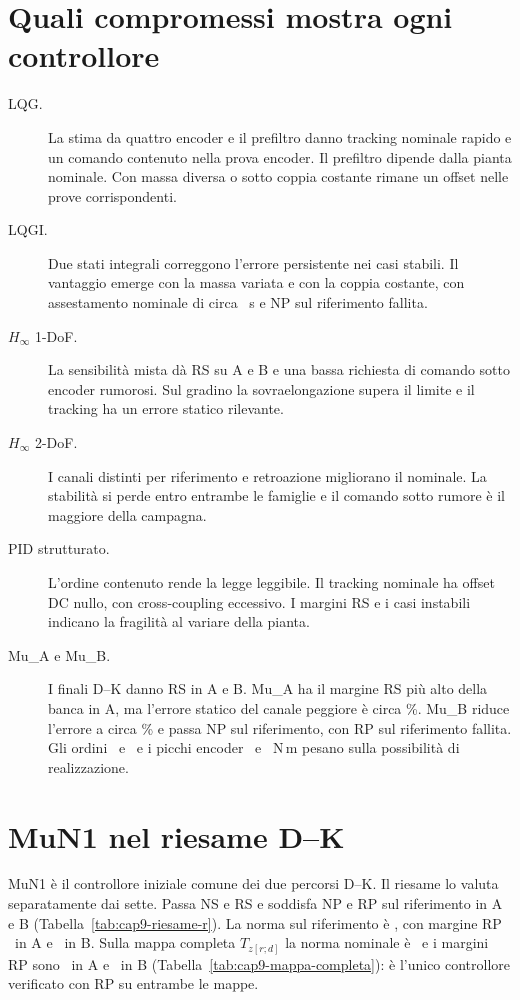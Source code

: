 \section{Quali compromessi mostra ogni controllore}
\begin{description}
\item[LQG.] La stima da quattro encoder e il prefiltro danno
tracking nominale rapido e un comando contenuto nella
prova encoder. Il prefiltro dipende dalla pianta nominale.
Con massa diversa o sotto coppia costante rimane un offset
nelle prove corrispondenti.
\item[LQGI.] Due stati integrali correggono l'errore persistente
nei casi stabili. Il vantaggio emerge con la massa variata
e con la coppia costante, con assestamento nominale di circa
\FinLQGITs\ s e NP sul riferimento fallita.
\item[$H_\infty$ 1-DoF.] La sensibilità mista dà RS su A e B
e una bassa richiesta di comando sotto encoder rumorosi.
Sul gradino la sovraelongazione supera il limite e il
tracking ha un errore statico rilevante.
\item[$H_\infty$ 2-DoF.] I canali distinti per riferimento
e retroazione migliorano il nominale. La stabilità si
perde entro entrambe le famiglie e il comando sotto
rumore è il maggiore della campagna.
\item[PID strutturato.] L'ordine contenuto rende la legge
leggibile. Il tracking nominale ha offset DC nullo, con
cross-coupling eccessivo. I margini RS e i casi instabili
indicano la fragilità al variare della pianta.
\item[Mu\_A e Mu\_B.] I finali D--K danno RS in A e B.
Mu\_A ha il margine RS più alto della banca in A, ma
l'errore statico del canale peggiore è circa \FinMuAEss\%.
Mu\_B riduce l'errore a circa \FinMuBEss\% e passa NP
sul riferimento, con RP sul riferimento fallita.
Gli ordini \FinMuAOrdine\ e \FinMuBOrdine\ e i picchi
encoder \FinMuAPeak\ e \FinMuBPeak\ N\,m pesano sulla
possibilità di realizzazione.
\end{description}

\section{MuN1 nel riesame D--K}
MuN1 è il controllore iniziale comune dei due percorsi D--K.
Il riesame lo valuta separatamente dai sette. Passa NS e RS
e soddisfa NP e RP sul riferimento in A e B
(Tabella~\ref{tab:cap9-riesame-r}). La norma sul
riferimento è \FinMuNOneNormaR, con margine RP
\FinMuNOneRPA\ in A e \FinMuNOneRPB\ in B.
Sulla mappa completa $T_{z[r;d]}$ la norma nominale è
\FinMuNOneNorma\ e i margini RP sono \FinMuNOneRPrdA\ in A
e \FinMuNOneRPrdB\ in B (Tabella~\ref{tab:cap9-mappa-completa}):
è l'unico controllore verificato con RP su entrambe le mappe.


